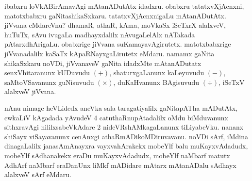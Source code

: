 \medskip

ibabxru loVkABirAmavAgi mAtanADutAtx idadxru. obabxru tatatxvXjAcnxni, matotxbabxru gaNitashikaSxkaru. tatatxvXjAcnxnigaLu mAtanADutAtx. jiVvana eMdareVnu? dhamaR, athaR, kAma, moVkaSx iSeTxrX alalxveV, huTuTx, sAvu ivugaLa madhayxdalilx nAvugaLelAlx nATakada pAtarxdhArigaLu. obabxrige jiVvana suKamayavAgirutetx. matotxbabxrige jiVvanadalilx kaSaTx kApaRNayxgaLirutetx eMdaru. namamx gaNita shikaSxkaru noVDi, jiVvanaveV gaNita idadxMte mAtanADutatx senxVhitaranunx kUDuvudu $(+)$, shaturxgaLanunx kaLeyuvudu $(-)$, saMtoVSavanunx guNisuvudu $(\times)$, duKaHvanunx BAgisuvudu $(\div)$, iSeTxV alalxveV jiVvana.

\medskip

nAnu nimage heVLidedx aneVka sala taragatiyalilx gaNitapATha mADutAtx, cwkaLiV kAgadada yAvudeV $4$ catuthaRnupAtadalilx oMdu biMduvanunx sithxravAgi nililxsabeVkAdare $2$ nideVRshAMkagaLanunx tiLiyabeVku. nananx shiSayx viSayavanunx cenAnxgi athaRmADikoMDiruvavanu. noVDi sArf, iMdina dinagaLalilx janasAmAnayxra vayxvahArakekx mobeYlf balu muKayxvAdadudx, mobeYlf sAdhanakekx eraDu muKayxvAdadudx, mobeYlf naMbarf matutx AdhArf naMbarf eraDanUnx liMkf mADidare mAtarx mAtanADalu sAdhayx alalxveV sArf eMdaru.

\newpage


